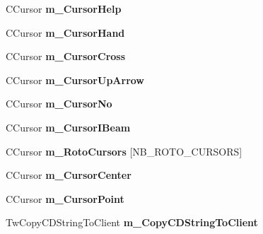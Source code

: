 \begin{DoxyCompactItemize}
\item 
\hypertarget{struct_c_tw_mgr_ab3facdb2f4a3e3b7b55de00f6ee60285}{C\+Cursor {\bfseries m\+\_\+\+Cursor\+Help}}\label{struct_c_tw_mgr_ab3facdb2f4a3e3b7b55de00f6ee60285}

\item 
\hypertarget{struct_c_tw_mgr_a02e86ef3399857e9679fa7fa25f77761}{C\+Cursor {\bfseries m\+\_\+\+Cursor\+Hand}}\label{struct_c_tw_mgr_a02e86ef3399857e9679fa7fa25f77761}

\item 
\hypertarget{struct_c_tw_mgr_a7ebcac6622e6a8c6eb5a0ac9ef09553c}{C\+Cursor {\bfseries m\+\_\+\+Cursor\+Cross}}\label{struct_c_tw_mgr_a7ebcac6622e6a8c6eb5a0ac9ef09553c}

\item 
\hypertarget{struct_c_tw_mgr_a2e00b18854110017637b62ea278a9a21}{C\+Cursor {\bfseries m\+\_\+\+Cursor\+Up\+Arrow}}\label{struct_c_tw_mgr_a2e00b18854110017637b62ea278a9a21}

\item 
\hypertarget{struct_c_tw_mgr_aa182562387b0c5fac714b1580c544bec}{C\+Cursor {\bfseries m\+\_\+\+Cursor\+No}}\label{struct_c_tw_mgr_aa182562387b0c5fac714b1580c544bec}

\item 
\hypertarget{struct_c_tw_mgr_a954cd7acd9dc36075e574d888c7b5d4b}{C\+Cursor {\bfseries m\+\_\+\+Cursor\+I\+Beam}}\label{struct_c_tw_mgr_a954cd7acd9dc36075e574d888c7b5d4b}

\item 
\hypertarget{struct_c_tw_mgr_a83e39406f56e421b6402e403d5a3501d}{C\+Cursor {\bfseries m\+\_\+\+Roto\+Cursors} \mbox{[}N\+B\+\_\+\+R\+O\+T\+O\+\_\+\+C\+U\+R\+S\+O\+R\+S\mbox{]}}\label{struct_c_tw_mgr_a83e39406f56e421b6402e403d5a3501d}

\item 
\hypertarget{struct_c_tw_mgr_a6158e86e60d4eef559b7d7339c56e563}{C\+Cursor {\bfseries m\+\_\+\+Cursor\+Center}}\label{struct_c_tw_mgr_a6158e86e60d4eef559b7d7339c56e563}

\item 
\hypertarget{struct_c_tw_mgr_a79d839679963f682d759c14dd250d490}{C\+Cursor {\bfseries m\+\_\+\+Cursor\+Point}}\label{struct_c_tw_mgr_a79d839679963f682d759c14dd250d490}

\item 
\hypertarget{struct_c_tw_mgr_a26d027cb7bad17d39497bed053239b1e}{Tw\+Copy\+C\+D\+String\+To\+Client {\bfseries m\+\_\+\+Copy\+C\+D\+String\+To\+Client}}\label{struct_c_tw_mgr_a26d027cb7bad17d39497bed053239b1e}


\end{DoxyCompactItemize}
